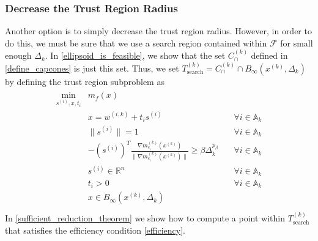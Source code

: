 \documentclass{article}
\newenvironment{comment}
  {\par\medskip
   \color{red}%
   \begin{framed}
   \textbf{Comment: }\ignorespaces}
 {\end{framed}
  \medskip}
\theoremstyle{case}
\numberwithin{theorem}{subsection}
\newcommand{\activeconstraintsk}{{\mathbb A_{k}}}
\newcommand{\capcones}{{C^{(k)}_{\cap}}}
\newcommand{\dk}{\Delta_k}
\newcommand{\feasible}{{\mathcal F}}
\newcommand{\hgik}{{\frac{\nabla m^{(k)}_{c_i}(\xk)}{\|\nabla m^{(k)}_{c_i}\left(\xk\right)\|}}}
\newcommand{\Rn}{\mathbb R^n}
\newcommand{\searchtrk}{{T_{\text{search}}^{(k)}}}
\newcommand{\tr}{{ B_{\infty}\left(\xk, \dk\right) }}
\newcommand{\wik}{{w^{(i, k)}}}
\newcommand{\xk}{x^{(k)}}
\begin{document}



\subsubsection{Decrease the Trust Region Radius}
\label{decreasing_the_trust_region_for_infeasible_trial}

Another option is to simply decrease the trust region radius.
However, in order to do this, we must be sure that we use a search region contained within $\feasible$ for small enough $\dk$.
In \cref{ellipsoid_is_feasible}, we show that the set $\capcones$ defined in \cref{define_capcones} is just this set.
Thus, we set $ \searchtrk = \capcones \cap \tr$ by defining the trust region subproblem as
\begin{align}
\label{capcones_tr_subproblem}
\begin{array}{ccc}
\min_{s^{(i)},x,t_i} & m_f(x) & \\
 & x = \wik + t _i s^{(i)} & \quad \forall i \in \activeconstraintsk \\
 & \|s^{(i)}\| = 1 & \quad \forall i \in \activeconstraintsk \\
 & -\left(s^{(i)}\right)^T\hgik \ge \beta \dk^{p_{\beta}} & \quad \forall i \in \activeconstraintsk \\
 & s^{(i)} \in \Rn  & \quad \forall i \in \activeconstraintsk \\
 & t_i > 0          & \quad \forall i \in \activeconstraintsk \\
 & x \in \tr		& \\
\end{array}
\end{align}
In \cref{sufficient_reduction_theorem} we show how to compute a point within $ \searchtrk $ that satisfies the efficiency condition \cref{efficiency}.


\end{document}
